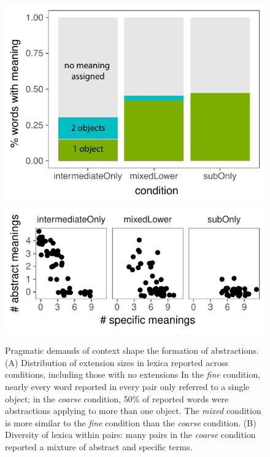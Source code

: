 \documentclass[10pt,letterpaper]{article}
\begin{document}
\begin{figure}[t]
\begin{center}
{\includegraphics[scale=0.7]{lexiconContent_edited.pdf}}
{\includegraphics[scale=0.87]{fullLexiconReport.pdf}}
{\caption{{Pragmatic demands of context shape the formation of abstractions. (A) Distribution of extension sizes in lexica reported across conditions, including those with no extensions  
In the \emph{fine} condition, nearly every word reported in every pair only referred to a single object; in the \emph{coarse} condition, 50\% of reported words were abstractions applying to more than one object. The \emph{mixed} condition is more similar to the \emph{fine} condition than the \emph{coarse} condition. (B) Diversity of lexica within pairs: many pairs in the \emph{coarse} condition reported a mixture of abstract and specific terms.   \label{fig:lexiconContent}}}}
\end{center}
\end{figure}
\end{document}
